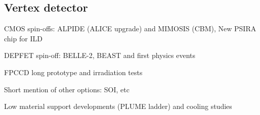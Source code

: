 \subsection{Vertex detector}

CMOS spin-offs: ALPIDE (ALICE upgrade) and MIMOSIS (CBM), New PSIRA chip for ILD

DEPFET spin-off: BELLE-2, BEAST and first physics events

FPCCD long prototype and irradiation tests

Short mention of other options:  SOI, etc

Low material support developments (PLUME ladder) and cooling studies

\vspace{2cm}
